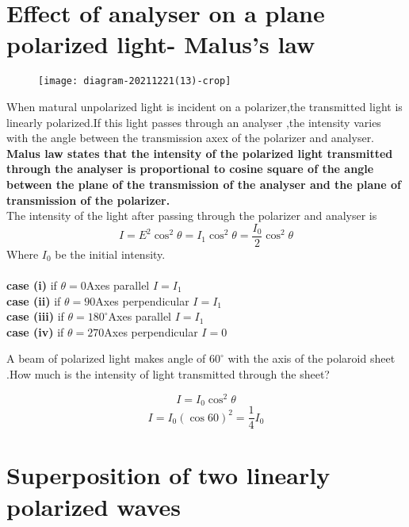          \section{Effect of analyser on a plane polarized light- Malus's law}
         \begin{figure}[H]
         	\centering
         	\texttt{[image: diagram-20211221(13)-crop]}
         	\caption{}
         	\label{}
         \end{figure}
     When matural unpolarized light is incident on a polarizer,the transmitted light is linearly polarized.If this light passes through an analyser ,the intensity varies with the angle between the transmission axex of the polarizer and analyser. \textbf{Malus law states that the intensity of the polarized light transmitted through the analyser is proportional to cosine square of the angle between the plane of the transmission of the analyser and the plane of transmission of the polarizer.}\\
     The intensity of the light after passing through the polarizer and analyser is \\
     $$I=E^2\cos^2\theta=I_1\cos^2\theta=\frac{I_0}{2}\cos^2\theta$$
     Where $I_0$ be the initial intensity.\\\\
     \textbf{case (i) } if $\theta=0$\quad \quad Axes parallel  \quad \quad $I=I_1$\\\textbf{case (ii) }if $\theta=90$\quad \quad Axes perpendicular \quad \quad $I=I_1$\\
 \textbf{case (iii) } if $\theta=180^{\circ}$\quad \quad Axes parallel \quad \quad $I=I_1$\\
 \textbf{case (iv) } if $\theta=270$\quad \quad Axes perpendicular  \quad \quad $I=0$
 \begin{exercise}
 	A beam of polarized light makes angle of $60^{\circ}$ with the axis of the polaroid sheet .How much is the intensity of light transmitted through the sheet?
 \end{exercise}
\begin{answer}
	$$I=I_0\cos^2\theta$$
	$$I=I_0(\cos60)^2=\frac{1}{4}I_0$$
\end{answer}
 \section{Superposition of two linearly polarized waves}
